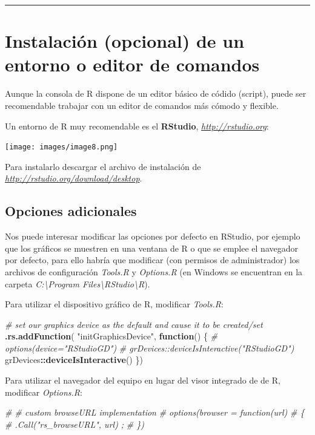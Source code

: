 \documentclass[
]{book}
\newenvironment{Shaded}{\begin{snugshade}}{\end{snugshade}}
\newcommand{\CommentTok}[1]{\textcolor[rgb]{0.56,0.35,0.01}{\textit{#1}}}
\newcommand{\ControlFlowTok}[1]{\textcolor[rgb]{0.13,0.29,0.53}{\textbf{#1}}}
\newcommand{\FunctionTok}[1]{\textcolor[rgb]{0.13,0.29,0.53}{\textbf{#1}}}
\newcommand{\NormalTok}[1]{#1}
\newcommand{\SpecialCharTok}[1]{\textcolor[rgb]{0.81,0.36,0.00}{\textbf{#1}}}
\newcommand{\StringTok}[1]{\textcolor[rgb]{0.31,0.60,0.02}{#1}}
\begin{document}
\begin{center}\rule{0.5\linewidth}{0.5pt}\end{center}

\section{Instalación (opcional) de un entorno o editor de comandos}\label{instalaciuxf3n-opcional-de-un-entorno-o-editor-de-comandos}

Aunque la consola de R dispone de un editor básico de códido (script),
puede ser recomendable trabajar con un editor de comandos más cómodo y
flexible.

Un entorno de R muy recomendable es el \textbf{RStudio},
\href{http://rstudio.org}{\emph{http://rstudio.org}}:

\texttt{[image: images/image8.png]}

Para instalarlo descargar el archivo de instalación de
\href{http://rstudio.org/download/desktop}{\emph{http://rstudio.org/download/desktop}}.

\subsection{Opciones adicionales}\label{opciones-adicionales}

Nos puede interesar modificar las opciones por defecto en RStudio, por ejemplo que los gráficos se muestren en una ventana de R o que se emplee el navegador por defecto, para ello habría que modificar (con permisos de administrador) los archivos de configuración \emph{Tools.R} y \emph{Options.R}
(en Windows se encuentran en la carpeta \emph{C:\textbackslash Program Files\textbackslash RStudio\textbackslash R}).

Para utilizar el dispositivo gráfico de R, modificar \emph{Tools.R}:

\begin{Shaded}
\begin{Highlighting}[]
\CommentTok{\# set our graphics device as the default and cause it to be created/set}
\FunctionTok{.rs.addFunction}\NormalTok{( }\StringTok{"initGraphicsDevice"}\NormalTok{, }\ControlFlowTok{function}\NormalTok{()}
\NormalTok{\{}
   \CommentTok{\# options(device="RStudioGD")}
   \CommentTok{\# grDevices::deviceIsInteractive("RStudioGD")}
\NormalTok{  grDevices}\SpecialCharTok{::}\FunctionTok{deviceIsInteractive}\NormalTok{()}
\NormalTok{\})}
\end{Highlighting}
\end{Shaded}

Para utilizar el navegador del equipo en lugar del visor integrado de de R, modificar \emph{Options.R}:

\begin{Shaded}
\begin{Highlighting}[]
\CommentTok{\# \# custom browseURL implementation}
\CommentTok{\# options(browser = function(url)}
\CommentTok{\# \{}
\CommentTok{\#    .Call("rs\_browseURL", url) ;}
\CommentTok{\# \})}
\end{Highlighting}
\end{Shaded}



\end{document}
